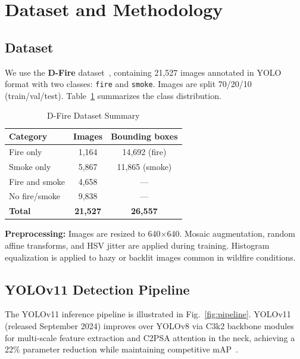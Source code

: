 \documentclass[conference]{IEEEtran}
\begin{document}
\section{Dataset and Methodology}
\label{sec:methodology}

\subsection{Dataset}

We use the \textbf{D-Fire} dataset~\cite{dfire2022}, containing 21,527
images annotated in YOLO format with two classes: \texttt{fire} and
\texttt{smoke}. Images are split 70/20/10 (train/val/test). Table~\ref{tab:dataset}
summarizes the class distribution.

\begin{table}[h]
\caption{D-Fire Dataset Summary}
\label{tab:dataset}
\centering
\begin{tabular}{lcc}
\toprule
\textbf{Category} & \textbf{Images} & \textbf{Bounding boxes} \\
\midrule
Fire only         & 1,164  & 14,692 (fire)  \\
Smoke only        & 5,867  & 11,865 (smoke) \\
Fire and smoke    & 4,658  & —              \\
No fire/smoke     & 9,838  & —              \\
\midrule
\textbf{Total}    & \textbf{21,527} & \textbf{26,557} \\
\bottomrule
\end{tabular}
\end{table}

\textbf{Preprocessing:} Images are resized to 640$\times$640. Mosaic
augmentation, random affine transforms, and HSV jitter are applied
during training. Histogram equalization is applied to hazy or backlit
images common in wildfire conditions.

\subsection{YOLOv11 Detection Pipeline}

The YOLOv11 inference pipeline is illustrated in
Fig.~\ref{fig:pipeline}. YOLOv11 (released September 2024) improves
over YOLOv8 via C3k2 backbone modules for multi-scale feature
extraction and C2PSA attention in the neck, achieving a 22\% parameter
reduction while maintaining competitive mAP~\cite{he2025yolov11}.
\end{document}
